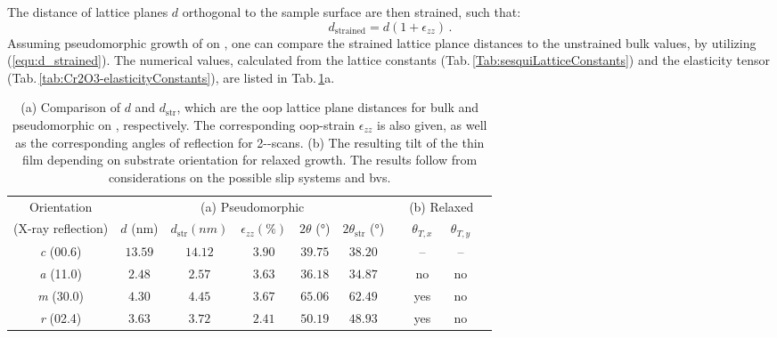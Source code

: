 The distance of lattice planes $d$ orthogonal to the sample surface are then strained, such that:
\begin{equation}
    \label{equ:d_strained}
    d_\mathrm{strained}=d(1+\epsilon_{zz})\,.
\end{equation}
Assuming pseudomorphic growth of  on , one can compare the strained lattice plance distances to the unstrained bulk values, by utilizing (\ref{equ:d_strained}).
The numerical values, calculated from the lattice constants (Tab.\,\ref{Tab:sesquiLatticeConstants}) and the elasticity tensor (Tab.\,\ref{tab:Cr2O3-elasticityConstants}), are listed in Tab.\,\ref{tab:d_strained}a.
\begin{table}
    \centering
    \caption{
        (a) Comparison of $d$ and $d_\mathrm{str}$, which are the \gls{oop} lattice plane distances for bulk  and pseudomorphic  on , respectively.
        The corresponding \gls{oop}-strain $\epsilon_{zz}$ is also given, as well as the corresponding angles of reflection for 2\texttheta-\textomega-scans.
        (b) The resulting tilt of the thin film depending on substrate orientation for relaxed growth. The results follow from considerations on the possible slip systems and \glspl{bv}.}
    \begin{tabular}{cccccccccc}
        \toprule
        Orientation
            & \multicolumn{5}{c}{(a) Pseudomorphic}
            &&  \multicolumn{2}{c}{(b) Relaxed}
        \\
        \cmidrule(lr){2-6}
        \cmidrule(lr){8-9}
        (X-ray reflection)
            & $d$ (\si{nm}) & $d_\mathrm{str} (\si{nm})$ & $\epsilon_{zz} (\si{\percent})$
            &$2\theta$ (\si{\degree})&$2\theta_\mathrm{str}$ (\si{\degree})&& $\theta_{T,x}$   & $\theta_{T,y}$
        \\ \midrule
        \textit{c} (00.6)& $13.59$  & $14.12$   & $3.90$    & $39.75$   & $38.20$   &&--&--\\
        \textit{a} (11.0)& $2.48 $  & $2.57 $   & $3.63$    & $36.18$   & $34.87$   &&no&no\\
        \textit{m} (30.0)& $4.30 $  & $4.45 $   & $3.67$    & $65.06$   & $62.49$   &&yes&no\\
        \textit{r} (02.4)& $3.63 $  & $3.72 $   & $2.41$    & $50.19$   & $48.93$   &&yes&no\\
        \bottomrule
    \end{tabular}
    \label{tab:d_strained}
\end{table}

